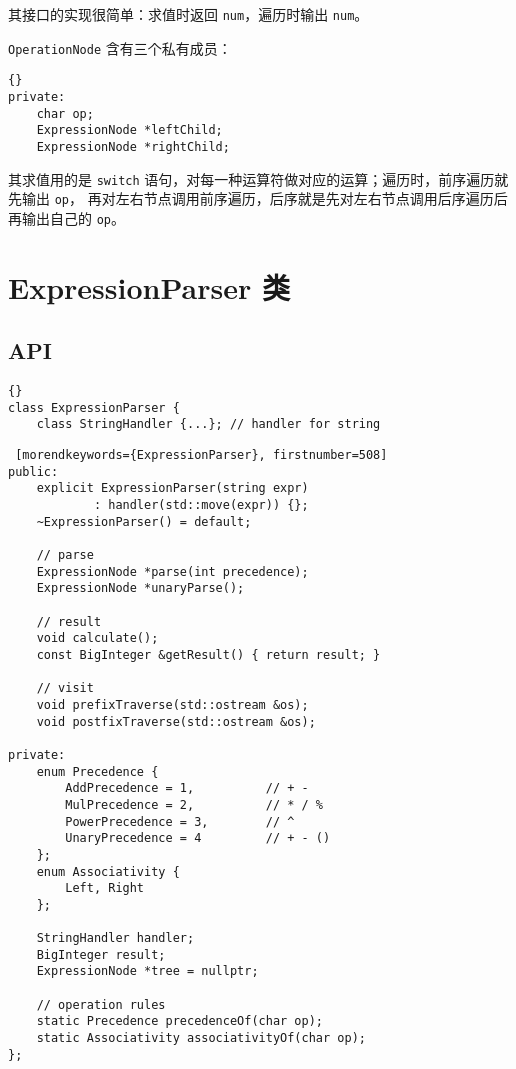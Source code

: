 其接口的实现很简单：求值时返回 \lstinline{num}，遍历时输出 \lstinline{num}。

\lstinline{OperationNode} 含有三个私有成员：

\begin{lstlisting}[morendkeywords={ExpressionNode}, firstnumber=434]{}
private:
    char op;
    ExpressionNode *leftChild;
    ExpressionNode *rightChild;
\end{lstlisting}

其求值用的是 \lstinline{switch} 语句，对每一种运算符做对应的运算；遍历时，前序遍历就先输出 \lstinline{op}，%
再对左右节点调用前序遍历，后序就是先对左右节点调用后序遍历后再输出自己的 \lstinline{op}。


\chapter{ExpressionParser 类}

\section{API}
\begin{lstlisting}[morendkeywords={ExpressionParser}, firstnumber=482, caption=ExpressionParser 类定义]{}
class ExpressionParser {
    class StringHandler {...}; // handler for string
\end{lstlisting}
\begin{lstlisting} [morendkeywords={ExpressionParser}, firstnumber=508]
public:
    explicit ExpressionParser(string expr) 
            : handler(std::move(expr)) {};
    ~ExpressionParser() = default;

    // parse
    ExpressionNode *parse(int precedence);
    ExpressionNode *unaryParse();

    // result
    void calculate();
    const BigInteger &getResult() { return result; }

    // visit
    void prefixTraverse(std::ostream &os);
    void postfixTraverse(std::ostream &os);

private:
    enum Precedence {
        AddPrecedence = 1,          // + -
        MulPrecedence = 2,          // * / %
        PowerPrecedence = 3,        // ^
        UnaryPrecedence = 4         // + - ()
    };
    enum Associativity {
        Left, Right
    };

    StringHandler handler;
    BigInteger result;
    ExpressionNode *tree = nullptr;

    // operation rules
    static Precedence precedenceOf(char op);
    static Associativity associativityOf(char op);
};
\end{lstlisting}

